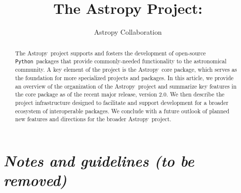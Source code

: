 \documentclass[modern]{aastex61}
\newcommand{\package}[1]{\texttt{#1}}
\newcommand{\python}{\package{Python}}
\newcommand{\astropy}{Astropy}
\begin{document}
\draft{\today}

\title{The Astropy Project: }


\author{Astropy Collaboration}

\begin{abstract}
The \astropy\ project supports and fosters the development of open-source
\python\ packages that provide commonly-needed functionality to the astronomical
community.
A key element of the project is the \astropy\ core package, which serves as the
foundation for more specialized projects and packages.
In this article, we provide an overview of the organization of the \astropy\
project and summarize key features in the core package as of the recent major
release, version 2.0.
We then describe the project infrastructure designed to facilitate and support
development for a broader ecosystem of interoperable packages.
We conclude with a future outlook of planned new features and directions for the
broader \astropy\ project.
\end{abstract}

\keywords{}

\section*{\textit{Notes and guidelines (to be removed)}}
\end{document}
